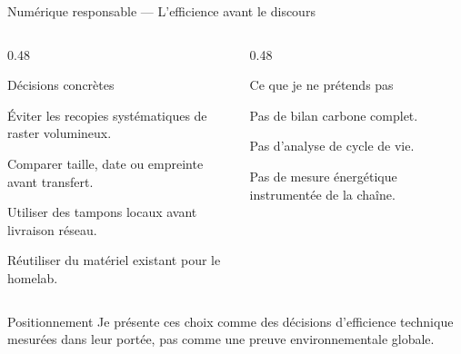 \begin{frame}{Numérique responsable — L'efficience avant le discours}
\begin{columns}[T]
\begin{column}{0.48\linewidth}
\begin{block}{Décisions concrètes}
\begin{tightitems}
  \item Éviter les recopies systématiques de raster volumineux.
  \item Comparer taille, date ou empreinte avant transfert.
  \item Utiliser des tampons locaux avant livraison réseau.
  \item Réutiliser du matériel existant pour le homelab.
\end{tightitems}
\end{block}
\end{column}
\begin{column}{0.48\linewidth}
\begin{block}{Ce que je ne prétends pas}
\begin{tightitems}
  \item Pas de bilan carbone complet.
  \item Pas d'analyse de cycle de vie.
  \item Pas de mesure énergétique instrumentée de la chaîne.
\end{tightitems}
\end{block}
\end{column}
\end{columns}
\begin{block}{Positionnement}
Je présente ces choix comme des décisions d'efficience technique mesurées dans leur portée, pas comme une preuve environnementale globale.
\end{block}
\end{frame}
